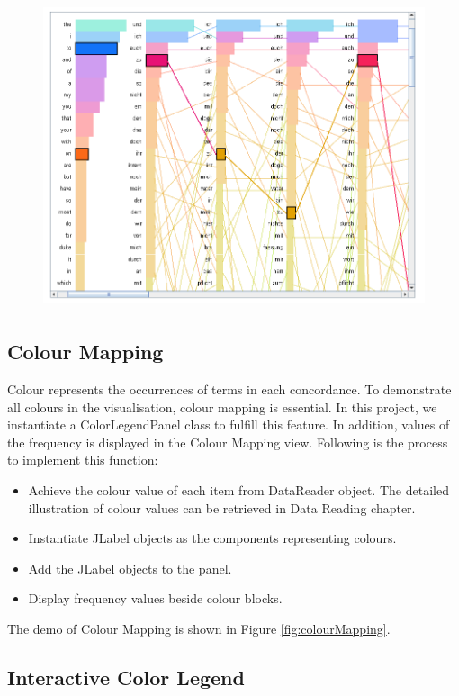 \begin{figure}[h]
	\centering	
	\includegraphics[width=16cm, height=9cm]{Figs/Highlight-Terms}\\[1ex]
	\caption{}
	\label{fig:highlightView}
\end{figure} 

\subsection{Colour Mapping}

Colour represents the occurrences of terms in each concordance. To demonstrate all colours in the visualisation, colour mapping is essential. In this project, we instantiate a ColorLegendPanel class to fulfill this feature. In addition, values of the frequency is displayed in the Colour Mapping view. Following is the process to implement this function: 
\begin{itemize}
	\item \textbf{} Achieve the colour value of each item from DataReader object. The detailed illustration of colour values can be retrieved in Data Reading chapter.
	\item \textbf{} Instantiate JLabel objects as the components representing colours.
	\item \textbf{} Add the JLabel objects to the panel.
	\item \textbf{} Display frequency values beside colour blocks.
\end{itemize}

The demo of Colour Mapping is shown in Figure \ref{fig:colourMapping}.

\subsection{Interactive Color Legend}


